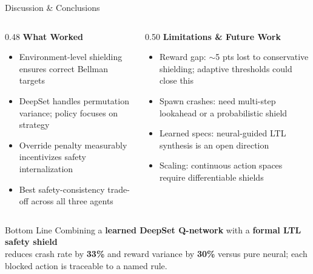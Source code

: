 \documentclass[aspectratio=169,10pt]{beamer}
\begin{document}
\begin{frame}{Discussion \& Conclusions}
  \begin{columns}[T]
    \begin{column}{0.48\textwidth}
      \textbf{What Worked}
      \begin{itemize}[<2->]\small
        \item Environment-level shielding ensures correct Bellman targets
        \item DeepSet handles permutation variance; policy focuses on strategy
        \item Override penalty measurably incentivizes safety internalization
        \item Best safety-consistency trade-off across all three agents
      \end{itemize}
    \end{column}
    \begin{column}{0.50\textwidth}
      \pause
      \textbf{Limitations \& Future Work}
      \begin{itemize}[<+->]\small
        \item Reward gap: \(\sim\)5 pts lost to conservative shielding; adaptive thresholds could close this
        \item Spawn crashes: need multi-step lookahead or a probabilistic shield
        \item Learned specs: neural-guided LTL synthesis is an open direction
        \item Scaling: continuous action spaces require differentiable shields
      \end{itemize}
    \end{column}
  \end{columns}

  \pause\vspace{8pt}
  \begin{block}{\centering Bottom Line}
    \centering
    Combining a \textcolor{neuralblue}{\textbf{learned DeepSet Q-network}} with a
    \textcolor{symbolicorange}{\textbf{formal LTL safety shield}}\\[2pt]
    reduces crash rate by \textbf{33\%} and reward variance by \textbf{30\%}
    versus pure neural; each blocked action is traceable to a named rule.
  \end{block}
\end{frame}
\end{document}
